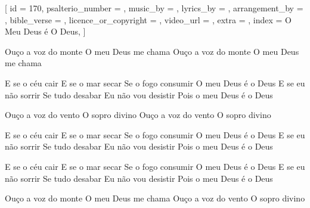 
[
    id                     = {170},
    psalterio_number       = {},
    music_by               = {},
    lyrics_by              = {},
    arrangement_by         = {},
    bible_verse            = {},
    licence_or_copyright   = {},
    video_url              = {},
    extra                  = {},
    index                  = {O Meu Deus é O Deus},
]


\beginverse

Ouço a voz do monte
O meu Deus me chama
Ouço a voz do monte
O meu Deus me chama

\endverse


\beginchorus

E se o céu cair
E se o mar secar
Se o fogo consumir
O meu Deus é o Deus
E se eu não sorrir
Se tudo desabar
Eu não vou desistir
Pois o meu Deus é o Deus

\endchorus


\beginverse

Ouço a voz do vento
O sopro divino
Ouço a voz do vento
O sopro divino

\endverse


\beginchorus

E se o céu cair
E se o mar secar
Se o fogo consumir
O meu Deus é o Deus
E se eu não sorrir
Se tudo desabar
Eu não vou desistir
Pois o meu Deus é o Deus

\endchorus


\beginchorus

E se o céu cair
E se o mar secar
Se o fogo consumir
O meu Deus é o Deus
E se eu não sorrir
Se tudo desabar
Eu não vou desistir
Pois o meu Deus é o Deus

\endchorus


\beginverse

Ouço a voz do monte
O meu Deus me chama
Ouço a voz do vento
O sopro divino

\endverse

\endsong
